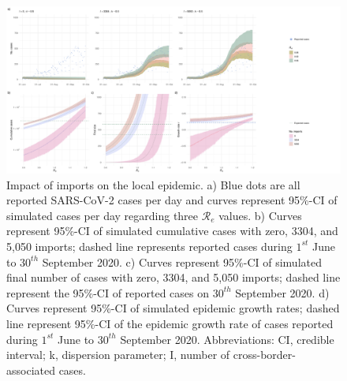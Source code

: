 \documentclass[10pt, a4paper, twoside]{article}
\begin{document}
\begin{multicols}{2}
\begin{figure}[h!]
\centering
\includegraphics[scale=0.3]{Figure2_2021-04-20.pdf}
\caption{Impact of imports on the local epidemic.
a) Blue dots are all reported SARS-CoV-2 cases per day and curves represent 95\%-CI of simulated cases per day regarding three $\mathcal{R}_e$ values.
b) Curves represent 95\%-CI of simulated cumulative cases with zero, 3304, and 5,050 imports; dashed line represents reported cases during $1^{st}$ June to $30^{th}$ September 2020. 
c) Curves represent 95\%-CI of simulated final number of cases with zero, 3304, and 5,050 imports; dashed line represent the 95\%-CI of reported cases on $30^{th}$ September 2020.
d) Curves represent 95\%-CI of simulated epidemic growth rates; dashed line represent 95\%-CI of the epidemic growth rate of cases reported during $1^{st}$ June to $30^{th}$ September 2020.
Abbreviations: CI, credible interval; k, dispersion parameter; I, number of cross-border-associated cases.}
\label{f2}
\end{figure}
\end{multicols}
\begin{landscape}
\global\pdfpageattr\expandafter{\the\pdfpageattr/Rotate 90}
}
\end{landscape}
\end{document}
